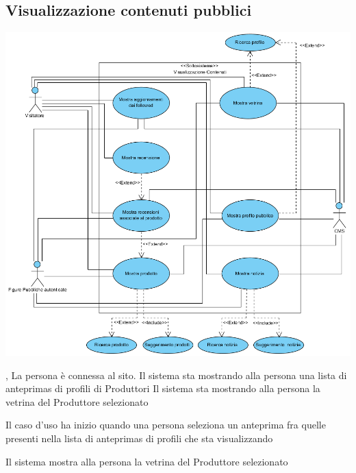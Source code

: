 \subsection{Visualizzazione contenuti pubblici}
\begin{center}
   \includegraphics[width=\textwidth]{assets/visualParadigm/cu/Visualizzazione}
\end{center}
{, }
{La persona è connessa al sito. Il sistema sta mostrando alla persona una lista di \glspl{anteprima} di profili di Produttori}
{Il sistema sta mostrando alla persona la vetrina del Produttore selezionato}
{\begin{enumCU}
	\item Il caso d'uso ha inizio quando una persona seleziona un \gls{anteprima} fra quelle presenti nella lista di \glspl{anteprima} di profili che sta visualizzando\label{cu:mostraVetr1}
	\item Il sistema mostra alla persona la vetrina del Produttore selezionato
\end{enumCU}
}
